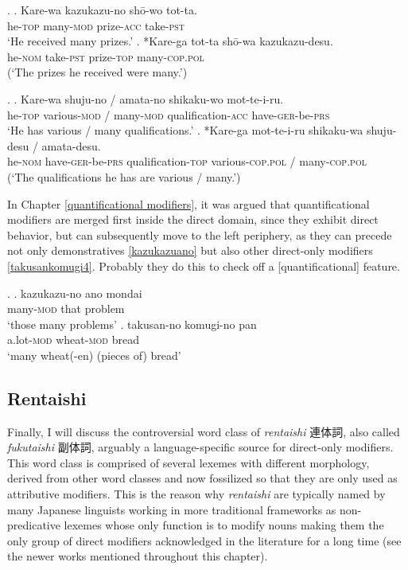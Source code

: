 \documentclass [output=book,colorlinks,citecolor=brown]{langscibook}
\begin{document}
\newpage

\ex. \ag. Kare-wa kazukazu-no shō-wo tot-ta.\\
he-\textsc{top} many-\textsc{mod} prize-\textsc{acc} take-\textsc{pst}\\
`He received many prizes.’
\bg. *Kare-ga tot-ta shō-wa kazukazu-desu.\\
he-\textsc{nom} take-\textsc{pst} prize-\textsc{top} many-\textsc{cop.pol}\\
(`The prizes he received were many.’)

\ex. \ag. Kare-wa shuju-no / amata-no shikaku-wo mot-te-i-ru.\\
he-\textsc{top} various-\textsc{mod} / many-\textsc{mod} qualification-\textsc{acc} have-\textsc{ger}-be-\textsc{prs}\\
`He has various / many qualifications.’
\bg. *Kare-ga mot-te-i-ru shikaku-wa shuju-desu / amata-desu.\\
he-\textsc{nom} have-\textsc{ger}-be-\textsc{prs} qualification-\textsc{top} various-\textsc{cop.pol} / many-\textsc{cop.pol}\\
(`The qualifications he has are various / many.’)

In Chapter \ref{quantificational modifiers}, it was argued that quantificational modifiers are merged first inside the direct domain, since they exhibit direct behavior, but can subsequently move to the left periphery, as they can precede not only demonstratives \ref{kazukazuano} but also other direct-only modifiers \ref{takusankomugi4}. Probably they do this to check off a [quantificational] feature. %


\ex. \ag. kazukazu-no ano mondai\\
many-\textsc{mod} that problem\\
`those many problems’ \label{kazukazuano}
\bg. takusan-no komugi-no pan\\
a.lot-\textsc{mod} wheat-\textsc{mod} bread\\
`many wheat(-en) (pieces of) bread’ \label{takusankomugi4}

\subsection{Rentaishi} \label{rentaishi}

Finally, I will discuss the controversial word class of \textit{rentaishi} 連体詞, also called \textit{fukutaishi} 副体詞, arguably a language-specific source for direct-only modifiers. This word class is comprised of several lexemes with different morphology, derived from other word classes and now fossilized so that they are only used as attributive modifiers. This is the reason why \textit{rentaishi} are typically named by many Japanese linguists working in more traditional frameworks as non-predicative lexemes whose only function is to modify nouns making them the only group of direct modifiers acknowledged in the literature for a long time (see the newer works mentioned throughout this chapter). %
\end{document}
